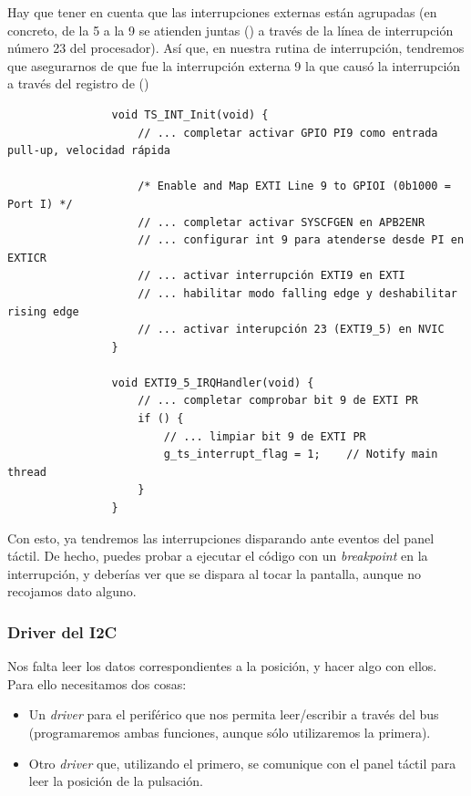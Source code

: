\documentclass[../main.tex]{subfiles}
\begin{document}
            Hay que tener en cuenta que las interrupciones externas están agrupadas (en concreto, de la 5 a la 9 se atienden juntas (\REFMAN[9.1.2]) a través de la línea de interrupción número 23 del procesador). Así que, en nuestra rutina de interrupción, tendremos que asegurarnos de que fue la interrupción externa 9 la que causó la interrupción a través del registro  de  (\REFMAN[10.9.6])

            \begin{lstlisting}
                void TS_INT_Init(void) {
                    // ... completar activar GPIO PI9 como entrada pull-up, velocidad rápida
                    
                    /* Enable and Map EXTI Line 9 to GPIOI (0b1000 = Port I) */
                    // ... completar activar SYSCFGEN en APB2ENR
                    // ... configurar int 9 para atenderse desde PI en EXTICR
                    // ... activar interrupción EXTI9 en EXTI
                    // ... habilitar modo falling edge y deshabilitar rising edge
                    // ... activar interupción 23 (EXTI9_5) en NVIC
                }

                void EXTI9_5_IRQHandler(void) {
                    // ... completar comprobar bit 9 de EXTI PR
                    if () {
                        // ... limpiar bit 9 de EXTI PR
                        g_ts_interrupt_flag = 1;	// Notify main thread
                    }
                }
            \end{lstlisting}

            Con esto, ya tendremos las interrupciones disparando ante eventos del panel táctil. De hecho, puedes probar a ejecutar el código con un \emph{breakpoint} en la interrupción, y deberías ver que se dispara al tocar la pantalla, aunque no recojamos dato alguno.

        \subsubsection{Driver del I2C}

            Nos falta leer los datos correspondientes a la posición, y hacer algo con ellos. Para ello necesitamos dos cosas: 

            \begin{itemize}
                \item Un \emph{driver} para el periférico  que nos permita leer/escribir a través del bus (programaremos ambas funciones, aunque sólo utilizaremos la primera).
                \item Otro \emph{driver} que, utilizando el primero, se comunique con el panel táctil para leer la posición de la pulsación.
            \end{itemize}
\end{document}
